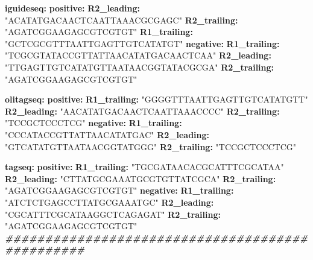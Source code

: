 \documentclass[
]{article}
\newenvironment{Shaded}{\begin{snugshade}}{\end{snugshade}}
\newcommand{\AttributeTok}[1]{\textcolor[rgb]{0.74,0.68,0.62}{#1}}
\newcommand{\CommentTok}[1]{\textcolor[rgb]{0.00,0.40,1.00}{\textbf{\textit{#1}}}}
\newcommand{\FunctionTok}[1]{\textcolor[rgb]{1.00,0.58,0.35}{\textbf{#1}}}
\newcommand{\KeywordTok}[1]{\textcolor[rgb]{0.26,0.66,0.93}{\textbf{#1}}}
\newcommand{\StringTok}[1]{\textcolor[rgb]{0.02,0.61,0.04}{#1}}
\begin{document}
\begin{Shaded}
\begin{Highlighting}[]
\FunctionTok{iguideseq}\KeywordTok{:}
\AttributeTok{  }\FunctionTok{positive}\KeywordTok{:}
\AttributeTok{    }\FunctionTok{R2\_leading}\KeywordTok{:}\AttributeTok{ }\StringTok{"ACATATGACAACTCAATTAAACGCGAGC"}
\AttributeTok{    }\FunctionTok{R2\_trailing}\KeywordTok{:}\AttributeTok{ }\StringTok{"AGATCGGAAGAGCGTCGTGT"}
\AttributeTok{    }\FunctionTok{R1\_trailing}\KeywordTok{:}\AttributeTok{ }\StringTok{"GCTCGCGTTTAATTGAGTTGTCATATGT"}
\AttributeTok{  }\FunctionTok{negative}\KeywordTok{:}
\AttributeTok{    }\FunctionTok{R1\_trailing}\KeywordTok{:}\AttributeTok{ }\StringTok{"TCGCGTATACCGTTATTAACATATGACAACTCAA"}
\AttributeTok{    }\FunctionTok{R2\_leading}\KeywordTok{:}\AttributeTok{ }\StringTok{"TTGAGTTGTCATATGTTAATAACGGTATACGCGA"}
\AttributeTok{    }\FunctionTok{R2\_trailing}\KeywordTok{:}\AttributeTok{ }\StringTok{"AGATCGGAAGAGCGTCGTGT"}

\FunctionTok{olitagseq}\KeywordTok{:}
\AttributeTok{  }\FunctionTok{positive}\KeywordTok{:}
\AttributeTok{    }\FunctionTok{R1\_trailing}\KeywordTok{:}\AttributeTok{ }\StringTok{"GGGGTTTAATTGAGTTGTCATATGTT"}
\AttributeTok{    }\FunctionTok{R2\_leading}\KeywordTok{:}\AttributeTok{ }\StringTok{"AACATATGACAACTCAATTAAACCCC"}
\AttributeTok{    }\FunctionTok{R2\_trailing}\KeywordTok{:}\AttributeTok{ }\StringTok{"TCCGCTCCCTCG"}
\AttributeTok{  }\FunctionTok{negative}\KeywordTok{:}
\AttributeTok{    }\FunctionTok{R1\_trailing}\KeywordTok{:}\AttributeTok{ }\StringTok{"CCCATACCGTTATTAACATATGAC"}
\AttributeTok{    }\FunctionTok{R2\_leading}\KeywordTok{:}\AttributeTok{ }\StringTok{"GTCATATGTTAATAACGGTATGGG"}
\AttributeTok{    }\FunctionTok{R2\_trailing}\KeywordTok{:}\AttributeTok{ }\StringTok{"TCCGCTCCCTCG"}

\FunctionTok{tagseq}\KeywordTok{:}
\AttributeTok{  }\FunctionTok{positive}\KeywordTok{:}
\AttributeTok{    }\FunctionTok{R1\_trailing}\KeywordTok{:}\AttributeTok{ }\StringTok{"TGCGATAACACGCATTTCGCATAA"}
\AttributeTok{    }\FunctionTok{R2\_leading}\KeywordTok{:}\AttributeTok{ }\StringTok{"CTTATGCGAAATGCGTGTTATCGCA"}
\AttributeTok{    }\FunctionTok{R2\_trailing}\KeywordTok{:}\AttributeTok{ }\StringTok{"AGATCGGAAGAGCGTCGTGT"}
\AttributeTok{  }\FunctionTok{negative}\KeywordTok{:}
\AttributeTok{    }\FunctionTok{R1\_trailing}\KeywordTok{:}\AttributeTok{ }\StringTok{"ATCTCTGAGCCTTATGCGAAATGC"}
\AttributeTok{    }\FunctionTok{R2\_leading}\KeywordTok{:}\AttributeTok{ }\StringTok{"CGCATTTCGCATAAGGCTCAGAGAT"}
\AttributeTok{    }\FunctionTok{R2\_trailing}\KeywordTok{:}\AttributeTok{ }\StringTok{"AGATCGGAAGAGCGTCGTGT"}
\CommentTok{\#\#\#\#\#\#\#\#\#\#\#\#\#\#\#\#\#\#\#\#\#\#\#\#\#\#\#\#\#\#\#\#\#\#\#\#\#\#\#\#\#\#\#\#\#\#\#\#}
\end{Highlighting}
\end{Shaded}
\end{document}
